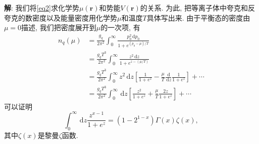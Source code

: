 \documentclass{ctexart}
\newenvironment{answer}{\textbf{解}:}{
\vspace{0.5cm}
}
\newcommand\diff{\,\mathrm{d}}
\begin{document}
\begin{answer}
我们将\eqref{eq2}求化学势$\mu(\bm{r})$和势能$V(\bm{r})$的关系. 为此, 把等离子体中夸克和反夸克的数密度以及能量密度用化学势$\mu$和温度$T$具体写出来. 由于平衡态的密度由$\mu = 0$描述, 我们把密度展开到$\mu$的一次项, 有
\begin{equation}\label{eq4}
  \begin{split}
    n_q(\mu) &= \frac{g_q}{2\pi^2} \int_0^\infty \frac{p_0^2 \diff p_0}{1 + e^{(p_0 - \mu)/T}} \\
    &= \frac{g_q T^3}{2\pi^2} \int_0^\infty \frac{z^2 \diff z}{1 + e^{z-(\mu/T)}} \\
    &= \frac{g_q T^3}{2\pi^2} \int_0^\infty z^2 \diff z \left[ \frac{1}{1 + e^z} - \frac{\mu}{T} \frac{\diff}{\diff z} \frac{1}{1 + e^z} \right] + \cdots \\
    &= \frac{g_q T^3}{2\pi^2} \int_0^\infty \diff z \left[ \frac{z^2}{1+e^z} + \frac{\mu}{T} \frac{2z}{1 + e^z}  \right] + \cdots
  \end{split}
\end{equation}
可以证明
\begin{equation}
  \int_0^\infty \diff z \frac{z^{x-1}}{1+e^z} = (1-2^{1-x}) \varGamma(x) \zeta(x),
\end{equation}
其中$\zeta(x)$是黎曼$\zeta$函数.


\end{answer}
\end{document}
